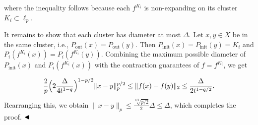 \documentclass[10pt,a4paper]{amsart}
\begin{document}
where the inequality follows because each $f^{K_{i}}$ is non-expanding on its cluster $K_{i}\subset\ell_{p}$.
\par
\par
It remains to show that each cluster has diameter at most $\Delta$. Let $x,y\in X$ be in the same cluster, i.e., $P_{\text{out}}(x)=P_{\text{out}}(y)$. Then $P_{\text{init}}(x)=P_{\text{init}}(y)=K_{i}$ and $P_{i}(f^{K_{i}}(x))=P_{i}(f^{K_{i}}(y))$. Combining the maximum possible diameter of $P_{\text{init}}(x)$ and $P_{i}(f^{K_{i}}(x))$ with the contraction guarantees of $f=f^{K_{i}}$, we get
\par
\[\begin{aligned}
\frac{2}{p}\Big{(}2\frac{\Delta}{4t^{1-q}}\Big{)}^{1-p/2}\|x-y\|_{p}^{p/2}\leq%
\|f(x)-f(y)\|_{2}\leq\frac{\Delta}{2t^{1-q/2}}.
\end{aligned}\]
Rearranging this, we obtain $\|x-y\|_{p}\leq\frac{\sqrt[p/2]{p/2}}{2}\Delta\leq\Delta$, which completes the proof. $\hfill\blacktriangleleft$
\par
\par
\par
\end{document}
